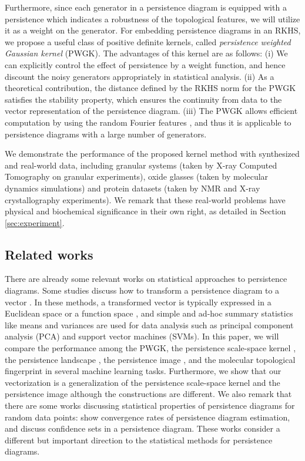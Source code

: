 \documentclass{article}
\begin{document}
Furthermore, since each generator in a persistence diagram is equipped with a persistence which indicates a robustness of the topological features, we will utilize it as a weight on the generator.
For embedding persistence diagrams in an RKHS, we propose a useful class of positive definite kernels, called {\em persistence weighted Gaussian kernel} (PWGK).
The advantages of this kernel are as follows:
(i) We can explicitly control the effect of persistence by a weight function, and hence discount the noisy generators appropriately in statistical analysis.
(ii) As a theoretical contribution, the distance defined by the RKHS norm for the PWGK satisfies the stability property, which ensures the continuity from data to the vector representation of the persistence diagram.
(iii) The PWGK allows efficient computation by using the random Fourier features \cite{RR07}, and thus it is applicable to persistence diagrams with a large number of generators.

We demonstrate the performance of the proposed kernel method with synthesized and real-world data, including granular systems (taken by X-ray Computed Tomography on granular experiments), oxide glasses (taken by molecular dynamics simulations) and protein datasets (taken by NMR and X-ray crystallography experiments).
We remark that these real-world problems have physical and biochemical significance in their own right, as detailed in Section \ref{sec:experiment}.

\subsection{Related works}
\label{subsec:related_work}

There are already some relevant works on statistical approaches to persistence diagrams.
Some studies discuss how to transform a persistence diagram to a vector \cite{AEKNPSCHMZ17, Bu15, CMWOXW15, COO15, RHBK15, RT16}.
In these methods, a transformed vector is typically expressed in a Euclidean space  or a function space , and simple and ad-hoc summary statistics like means and variances are used for data analysis such as principal component analysis (PCA) and support vector machines (SVMs).
In this paper, we will compare the performance among the PWGK, the persistence scale-space kernel \cite{RHBK15}, the persistence landscape \cite{Bu15}, the persistence image \cite{AEKNPSCHMZ17}, and the molecular topological fingerprint \cite{CMWOXW15} in several machine learning tasks.
Furthermore, we show that our vectorization is a generalization of the persistence scale-space kernel and the persistence image although the constructions are different.
We also remark that there are some works discussing statistical properties of persistence diagrams for random data points:
\cite{CGLM15} show convergence rates of persistence diagram estimation, and \cite{FLRWBS14} discuss confidence sets in a persistence diagram.
These works consider a different but important direction to the statistical methods for persistence diagrams.
\end{document}
